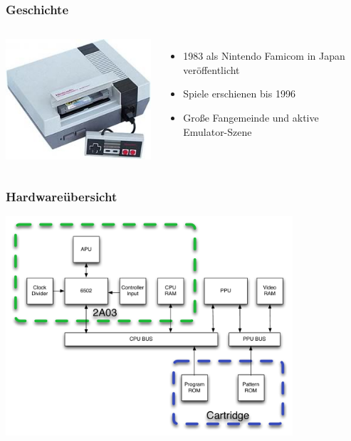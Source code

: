 \documentclass{beamer}
\begin{document}
    
        
    \begin{frame}
        \frametitle{Geschichte}
        \begin{columns}
                \includegraphics[width=1.1\textwidth]{img/nes.jpg}
                
             
                \begin{itemize}
                    \item{1983 als Nintendo Famicom in Japan veröffentlicht}
                    \item{Spiele erschienen bis 1996}
                    \item{Große Fangemeinde und aktive Emulator-Szene}
                \end{itemize}
        \end{columns}
    \end{frame}
    
    
    \begin{frame}
        \frametitle{Hardwareübersicht}
        \includegraphics[width=0.8\textwidth]{img/system1.pdf}
    \end{frame}
    
\end{document}
